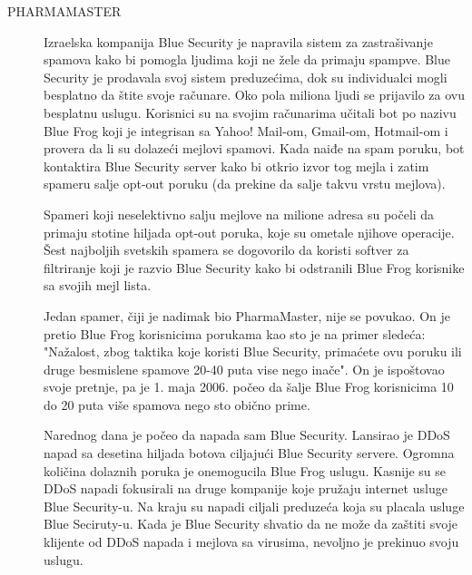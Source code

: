 \documentclass[a4paper]{article}
\theoremstyle{break}
\begin{document}
{\begin{description}
\item[PHARMAMASTER] Izraelska kompanija Blue Security je napravila sistem za zastrašivanje spamova kako bi pomogla ljudima koji ne žele da primaju spampve. Blue Security je prodavala svoj sistem preduzećima, dok su individualci mogli besplatno da štite svoje računare. Oko pola miliona ljudi se prijavilo za ovu besplatnu uslugu. Korisnici su na svojim računarima učitali bot po nazivu Blue Frog koji je integrisan sa Yahoo! Mail-om, Gmail-om, Hotmail-om i provera da li su dolazeći mejlovi spamovi. Kada naiđe na spam poruku, bot kontaktira Blue Security server kako bi otkrio izvor tog mejla i zatim spameru salje opt-out poruku (da prekine da salje takvu vrstu mejlova).

Spameri koji neselektivno salju mejlove na milione adresa su počeli da primaju stotine hiljada opt-out poruka, koje su ometale njihove operacije. Šest najboljih svetskih spamera se dogovorilo da koristi softver za filtriranje koji je razvio Blue Security kako bi odstranili Blue Frog korisnike sa svojih mejl lista.

Jedan spamer, čiji je nadimak bio PharmaMaster, nije se povukao. On je pretio Blue Frog korisnicima porukama kao sto je na primer sledeća: "Nažalost, zbog taktika koje koristi Blue Security, primaćete ovu poruku ili druge besmislene spamove 20-40 puta vise nego inače". On je ispoštovao svoje pretnje, pa je 1. maja 2006. počeo da šalje Blue Frog korisnicima 10 do 20 puta više spamova nego sto obično prime.

Narednog dana je počeo da napada sam Blue Security. Lansirao je DDoS napad sa desetina hiljada botova ciljajući Blue Security servere. Ogromna količina dolaznih poruka je onemogucila Blue Frog uslugu. Kasnije su se DDoS napadi fokusirali na druge kompanije koje pružaju internet usluge Blue Security-u. Na kraju su napadi ciljali preduzeća koja su placala usluge Blue Seciruty-u. Kada je Blue Security shvatio da ne može da zaštiti svoje klijente od DDoS napada i mejlova sa virusima, nevoljno je prekinuo svoju uslugu.


\end{description}}
\end{document}
